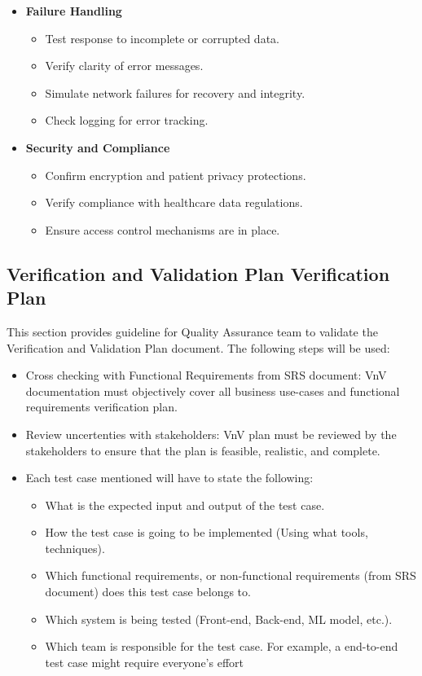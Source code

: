 \documentclass[12pt, titlepage]{article}
\begin{document}
\begin{itemize}
    \item \textbf{Failure Handling}
    \begin{itemize}
        \item Test response to incomplete or corrupted data.
        \item Verify clarity of error messages.
        \item Simulate network failures for recovery and integrity.
        \item Check logging for error tracking.
    \end{itemize}

    \item \textbf{Security and Compliance}
    \begin{itemize}
        \item Confirm encryption and patient privacy protections.
        \item Verify compliance with healthcare data regulations.
        \item Ensure access control mechanisms are in place.
    \end{itemize}
\end{itemize}
\subsection{Verification and Validation Plan Verification Plan}

This section provides guideline for Quality Assurance team to validate the Verification and Validation Plan document. The following steps will be used:
\begin{itemize}
  \item{Cross checking with Functional Requirements from SRS document: VnV documentation must objectively cover all business use-cases and functional requirements verification plan.}
  \item{Review uncertenties with stakeholders: VnV plan must be reviewed by the stakeholders to ensure that the plan is feasible, realistic, and complete.}
  \item{Each test case mentioned will have to state the following:}
  \begin{itemize}
    \item{What is the expected input and output of the test case.}
    \item{How the test case is going to be implemented (Using what tools, techniques).}
    \item{Which functional requirements, or non-functional requirements (from SRS document) does this test case belongs to.}
    \item{Which system is being tested (Front-end, Back-end, ML model, etc.).}
    \item{Which team is responsible for the test case. For example, a end-to-end test case might require everyone's effort}
  \end{itemize}
\end{itemize}
\end{document}

